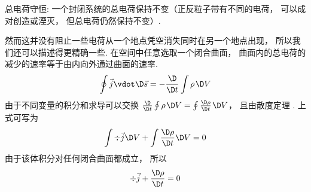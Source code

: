 总电荷守恒: 一个封闭系统的总电荷保持不变（正反粒子带有不同的电荷， 可以成对创造或湮灭， 但总电荷仍然保持不变）.

然而这并没有阻止一些电荷从一个地点凭空消失同时在另一个地点出现， 所以我们还可以描述得更精确一些. 在空间中任意选取一个闭合曲面， 曲面内的总电荷的减少的速率等于由内向外通过曲面的速率.
\begin{equation}
\oint {\vec j \vdot \D \vec s}  =  - \frac{\D }{{\D t}}\int {\rho {\kern 1pt} \D V} 
\end{equation} 
由于不同变量的积分和求导可以交换 $\frac{\D }{{\D t}}\oint {\rho {\kern 1pt} \D V}  = \oint {\frac{{\D \rho }}{{\D t}}{\kern 1pt} \D V} $， 且由散度定理%
 . 上式可写为
\begin{equation}
\int {\div \vec j \D V}  + \int {\frac{{\D \rho }}{{\D t}}\D V}  = 0
\end{equation} 
由于该体积分对任何闭合曲面都成立， 所以
\begin{equation}
\div \vec j + \frac{{\D \rho }}{{\D t}} = 0
\end{equation} 